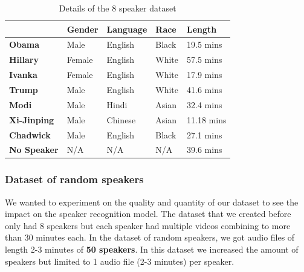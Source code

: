 \documentclass[10pt,twocolumn,letterpaper]{article}
\begin{document}
{\begin{table}[h]
    \begin{tabular}{l|l|l|l|l|}
    \cline{2-5}
                                                    & \textbf{Gender} & \textbf{Language} & \textbf{Race} & \textbf{Length} \\ \hline
    \multicolumn{1}{|l|}{\textbf{Obama}}            & Male            & English           & Black         & 19.5 mins       \\ \hline
    \multicolumn{1}{|l|}{\textbf{Hillary}}          & Female          & English           & White         & 57.5 mins       \\ \hline
    \multicolumn{1}{|l|}{\textbf{Ivanka}}           & Female          & English           & White         & 17.9 mins       \\ \hline
    \multicolumn{1}{|l|}{\textbf{Trump}}            & Male            & English           & White         & 41.6 mins       \\ \hline
    \multicolumn{1}{|l|}{\textbf{Modi}}             & Male            & Hindi             & Asian         & 32.4 mins       \\ \hline
    \multicolumn{1}{|l|}{\textbf{Xi-Jinping}}       & Male            & Chinese           & Asian         & 11.18 mins      \\ \hline
    \multicolumn{1}{|l|}{\textbf{Chadwick}}         & Male            & English           & Black         & 27.1 mins       \\ \hline
    \multicolumn{1}{|l|}{\textbf{No Speaker}}       & N/A             & N/A               & N/A           & 39.6 mins       \\ \hline
    \end{tabular}
    \caption{Details of the 8 speaker dataset}
    \label{tab:8-speaker-dataset}
\end{table}


\subsubsection{Dataset of random speakers}

We wanted to experiment on the quality and quantity of our dataset to see the impact on the speaker recognition model. The dataset that we created before only had 8 speakers but each speaker had multiple videos combining to more than 30 minutes each. In the dataset of random speakers, we got audio files of length 2-3 minutes of \textbf{50 speakers}. In this dataset we increased the amount of speakers but limited to 1 audio file (2-3 minutes) per speaker. 

}
\end{document}
